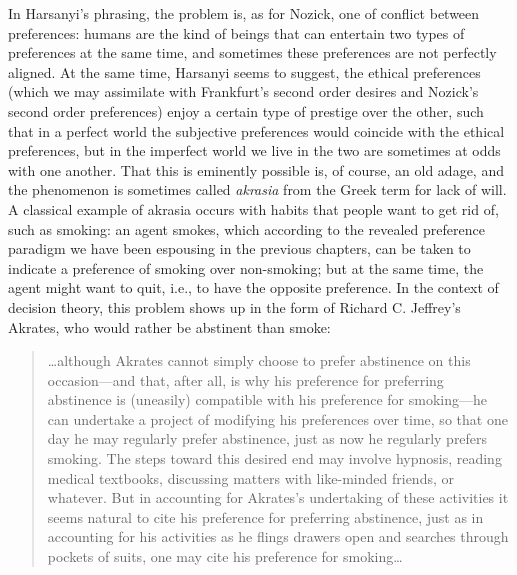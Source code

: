 In Harsanyi's phrasing, the problem is, as for Nozick, one of conflict
between preferences: humans are the kind of beings that can 
entertain two types of preferences at the same time,
and sometimes these preferences are not perfectly aligned.
At the same time, Harsanyi seems to suggest, the ethical preferences
(which we may assimilate with Frankfurt's second order desires
and Nozick's second order preferences)
enjoy a certain type of prestige over the other,
such that in a perfect world the subjective preferences 
would coincide with the ethical preferences,
but in the imperfect world we live in the two are sometimes 
at odds with one another.
That this is eminently possible is, of course, 
an old adage, and the phenomenon is sometimes called \emph{akrasia}
from the Greek term for lack of will.
A classical example of akrasia occurs with habits that people
want to get rid of, such as smoking: 
an agent smokes, which according to the revealed preference paradigm
we have been espousing in the previous chapters,
can be taken to indicate a preference of smoking over non-smoking;
but at the same time, the agent might want to quit,
i.e., to have the opposite preference.
In the context of decision theory, this problem shows up in the form 
of Richard C. Jeffrey's Akrates, 
who would rather be abstinent than smoke:

\begin{quote}
	\dots although Akrates cannot simply choose to prefer abstinence 
	on this occasion---and that, after all, is why his preference 
	for preferring abstinence is (uneasily) compatible with his 
	preference for smoking---he can undertake a project of modifying 
	his preferences over time, so that one day he may regularly prefer 
	abstinence, just as now he regularly prefers smoking. 
	The steps toward this desired end may involve hypnosis, 
	reading medical textbooks, discussing matters with like-minded friends, 
	or whatever. But in accounting for Akrates's undertaking of these 
	activities it seems natural to cite his preference for preferring 
	abstinence, just as in accounting for his activities as he flings 
	drawers open and searches through pockets of suits, 
	one may cite his preference for smoking\dots 
	\cite{Jeffrey74}
\end{quote}

